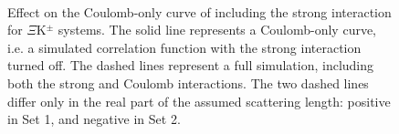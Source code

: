 \documentclass[../AnalysisNoteJBuxton.tex]{subfiles}
\begin{document}
\begin{figure}[h]
  \centering
  \\
  \caption[Effect of Strong Force Inclusion on Coulomb-Only Curve for $\Xi$K$^{\pm}$ systems]{Effect on the Coulomb-only curve of including the strong interaction for $\Xi$K$^{\pm}$ systems.  The solid line represents a Coulomb-only curve, i.e. a simulated correlation function with the strong interaction turned off.  The dashed lines represent a full simulation, including both the strong and Coulomb interactions.  The two dashed lines differ only in the real part of the assumed scattering length: positive in Set 1, and negative in Set 2.}
  \label{fig:XiKchStrongInfluence}
\end{figure}
\end{document}
